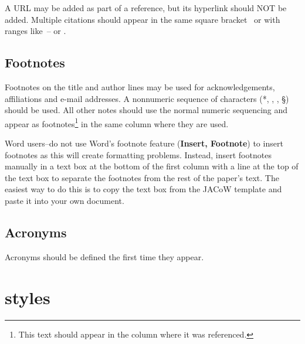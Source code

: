 \documentclass[acus]{jacow}
\begin{document}
A URL may be added as part of a reference, but
its hyperlink should NOT be added. Multiple citations should appear in
the same square bracket~\cite{exampl-ref2, exampl-ref3} or
with ranges like~\cite{exampl-ref2}--\cite{exampl-ref3} or \cite{exampl-ref2, jacow-help, exampl-ref, exampl-ref2, exampl-ref3}.

\subsection{Footnotes}

Footnotes on the title and author lines may be used for acknowledgements,
affiliations and e-mail addresses. A nonnumeric sequence of characters (*,
\dag, \ddag, \S) should be used. All other notes should use the normal numeric
sequencing and appear as footnotes\footnote{This text should appear
in the column where it was referenced.} in the same column where they are used.

Word users--do not use Word's footnote feature (\textbf{Insert, Footnote})
to insert footnotes as this will create formatting problems. Instead, insert
footnotes manually in a text box at the bottom of the first column with a
line at the top of the text box to separate the footnotes from the rest of
the paper's text.  The easiest way to do this is to copy the text box from
the JACoW template and paste it into your own document.

\subsection{Acronyms}

Acronyms should be defined the first time they appear.

\section{styles}
\end{document}

